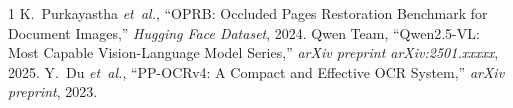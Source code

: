 \documentclass[conference,10pt,a4paper]{IEEEtran}
\begin{document}

\begin{thebibliography}{1}
K.~Purkayastha \emph{et~al.}, ``OPRB: Occluded Pages Restoration Benchmark for Document Images,'' \emph{Hugging Face Dataset}, 2024.
Qwen Team, ``Qwen2.5-VL: Most Capable Vision-Language Model Series,'' \emph{arXiv preprint arXiv:2501.xxxxx}, 2025.
Y.~Du \emph{et~al.}, ``PP-OCRv4: A Compact and Effective OCR System,'' \emph{arXiv preprint}, 2023.
\end{thebibliography}
\end{document}
